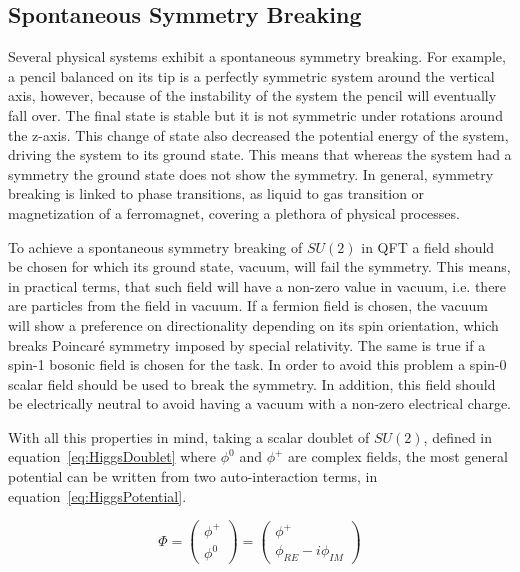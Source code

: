 \subsection{Spontaneous Symmetry Breaking}
\label{sec:SSB}

Several physical systems exhibit a spontaneous symmetry breaking. For example, a pencil balanced on its tip is a perfectly symmetric system around the vertical axis, however, because of the instability of the system the pencil will eventually fall over. The final state is stable but it is not symmetric under rotations around the z-axis. This change of state also decreased the potential energy of the system, driving the system to its ground state. This means that whereas the system had a symmetry the ground state does not show the symmetry. In general, symmetry breaking is linked to phase transitions, as liquid to gas transition or magnetization of a ferromagnet, covering a plethora of physical processes. %

To achieve a spontaneous symmetry breaking of $SU(2)$ in QFT a field should be chosen for which its ground state, vacuum, will fail the symmetry. This means, in practical terms, that such field will have a non-zero value in vacuum, i.e. there are particles from the field in vacuum. If a fermion field is chosen, the vacuum will show a preference on directionality depending on its spin orientation, which breaks Poincar\'{e} symmetry imposed by special relativity. The same is true if a spin-1 bosonic field is chosen for the task. In order to avoid this problem a spin-0 scalar field should be used to break the symmetry. In addition, this field should be electrically neutral to avoid having a vacuum with a non-zero electrical charge.

With all this properties in mind, taking a scalar doublet of $SU(2)$, defined in equation~\ref{eq:HiggsDoublet} where $\phi^{0}$ and $\phi^{+}$ are complex fields, the most general potential can be written from two auto-interaction terms, in equation~\ref{eq:HiggsPotential}.

\begin{equation}
  \label{eq:HiggsDoublet}
  \Phi=\left(
    \begin{array}{c}
      \phi^{+} \\
      \phi^{0}
    \end{array}
  \right)=\left(
    \begin{array}{c}
      \phi^{+} \\
      \phi_{RE}-i\phi_{IM}
    \end{array}
  \right)
\end{equation}

